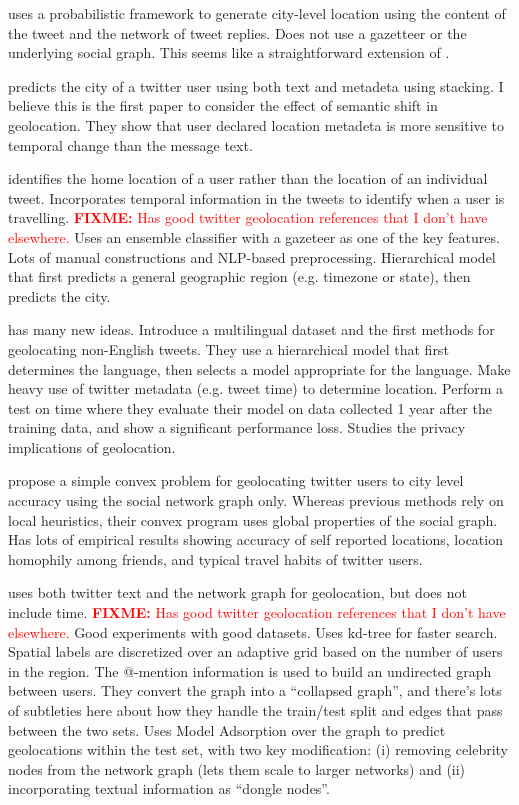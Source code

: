 \documentclass[sigconf,10pt]{acmart}
\newcommand{\fixme}[1]{\textcolor{red}{\textbf{FIXME:} {#1}}}
\begin{document}
\citet{li2012towards} uses a probabilistic framework to generate city-level location using the content of the tweet and the network of tweet replies.
Does not use a gazetteer or the underlying social graph.
This seems like a straightforward extension of \citet{cheng2010you}.

\citet{han2013stacking} predicts the city of a twitter user using both text and metadeta using stacking.
I believe this is the first paper to consider the effect of semantic shift in geolocation.
They show that user declared location metadeta is more sensitive to temporal change than the message text.

\citet{mahmud2014home} identifies the home location of a user rather than the location of an individual tweet.
Incorporates temporal information in the tweets to identify when a user is travelling.
\fixme{Has good twitter geolocation references that I don't have elsewhere.}
Uses an ensemble classifier with a gazeteer as one of the key features.
Lots of manual constructions and NLP-based preprocessing.
Hierarchical model that first predicts a general geographic region (e.g. timezone or state), then predicts the city.

\citet{han2014text} has many new ideas.
Introduce a multilingual dataset and the first methods for geolocating non-English tweets.
They use a hierarchical model that first determines the language,
then selects a model appropriate for the language.
Make heavy use of twitter metadata (e.g. tweet time) to determine location.
Perform a test on time where they evaluate their model on data collected 1 year after the training data, and show a significant performance loss.
Studies the privacy implications of geolocation.

\citet{compton2014geotagging} propose a simple convex problem for geolocating twitter users to city level accuracy using the social network graph only.
Whereas previous methods rely on local heuristics, their convex program uses global properties of the social graph.
Has lots of empirical results showing accuracy of self reported locations, location homophily among friends, and typical travel habits of twitter users.

\citet{rahimi2015twitter} uses both twitter text and the network graph for geolocation, but does not include time.
\fixme{Has good twitter geolocation references that I don't have elsewhere.}
Good experiments with good datasets.
Uses kd-tree for faster search.
Spatial labels are discretized over an adaptive grid based on the number of users in the region.
The @-mention information is used to build an undirected graph between users.
They convert the graph into a ``collapsed graph'', and there's lots of subtleties here about how they handle the train/test split and edges that pass between the two sets.
Uses Model Adsorption over the graph to predict geolocations within the test set, 
with two key modification:
(i) removing celebrity nodes from the network graph (lets them scale to larger networks)
and (ii) incorporating textual information as ``dongle nodes''.
\end{document}
